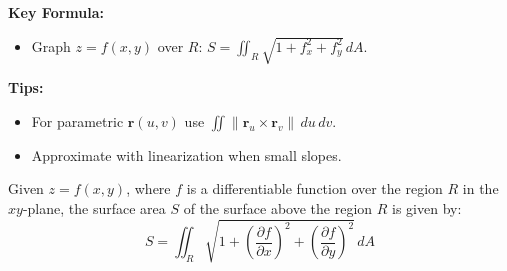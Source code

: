 \documentclass[11pt]{report}
\begin{document}
\begin{keybox}
	\textbf{Key Formula:}
\begin{itemize}
    \item Graph $z=f(x,y)$ over $R$: $\displaystyle S=\iint_R \sqrt{1+f_x^2+f_y^2}\,dA$.
\end{itemize}
	\textbf{Tips:}
\begin{itemize}
    \item For parametric $\mathbf r(u,v)$ use $\iint\!\lVert \mathbf r_u\times\mathbf r_v\rVert\,du\,dv$.
    \item Approximate with linearization when small slopes.
\end{itemize}
\end{keybox}
\begin{theorem}
    Given $z=f(x,y)$, where $f$ is a differentiable function over the region $R$ in the $xy$-plane, the surface area $S$ of the surface above the region $R$ is given by:
    \begin{equation}
        S = \iint_R \sqrt{1 + \left( \frac{\partial f}{\partial x} \right)^2 + \left( \frac{\partial f}{\partial y} \right)^2} \, dA
    \end{equation}
\end{theorem}
\end{document}
